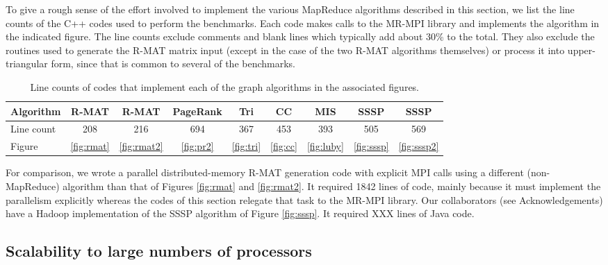 To give a rough sense of the effort involved to implement the various
MapReduce algorithms described in this section, we list the line
counts of the C++ codes used to perform the benchmarks.  Each code
makes calls to the MR-MPI library and implements the algorithm in the
indicated figure.  The line counts exclude comments and blank lines
which typically add about 30\% to the total.  They also exclude the
routines used to generate the R-MAT matrix input (except in the case
of the two R-MAT algorithms themselves) or process it into
upper-triangular form, since that is common to several of the
benchmarks.

\begin{table}
\begin{center}
\begin{tabular}{|l|c|c|c|c|c|c|c|c|}
\hline
Algorithm & R-MAT & R-MAT & PageRank & Tri & CC & MIS & SSSP & SSSP \\
\hline
Line count & 208 & 216 & 694 & 367 & 453 & 393 & 505 & 569 \\
Figure & \ref{fig:rmat} & \ref{fig:rmat2} & \ref{fig:pr2} & \ref{fig:tri} & \ref{fig:cc} & \ref{fig:luby} & \ref{fig:sssp} & \ref{fig:sssp2} \\
\hline
\end{tabular}
\caption{Line counts of codes that implement each of the graph
  algorithms in the associated figures.}
\label{t:rmat}
\end{center}
\end{table}

For comparison, we wrote a parallel distributed-memory R-MAT
generation code with explicit MPI calls using a different
(non-MapReduce) algorithm than that of Figures \ref{fig:rmat} and
\ref{fig:rmat2}.  It required 1842 lines of code, mainly because it
must implement the parallelism explicitly whereas the codes of this
section relegate that task to the MR-MPI library.  Our collaborators
(see Acknowledgements) have a Hadoop implementation of the SSSP
algorithm of Figure \ref{fig:sssp}.  It required XXX lines of Java
code.

\subsection{Scalability to large numbers of processors}

